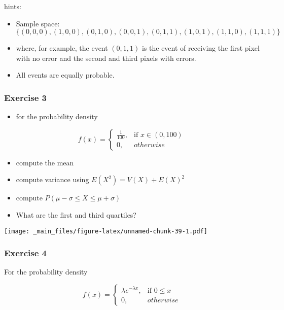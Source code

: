 \documentclass[
]{book}
\providecommand{\tightlist}{%
  \setlength{\itemsep}{0pt}\setlength{\parskip}{0pt}}
\begin{document}
hints:

\begin{itemize}
\item
  Sample space: \(\{(0,0,0), (1,0,0), (0,1,0), (0,0,1), (0,1,1), (1,0,1), (1,1,0), (1,1,1)\}\)
\item
  where, for example, the event \((0,1,1)\) is the event of receiving the first pixel with no error and the second and third pixels with errors.
\item
  All events are equally probable.
\end{itemize}

\hypertarget{exercise-3-1}{%
\subsubsection{Exercise 3}\label{exercise-3-1}}

\begin{itemize}
\tightlist
\item
  for the probability density
\end{itemize}

\[
    f(x)= 
\begin{cases}
    \frac{1}{100},& \text{if } x\in (0,100)\\
    0,& otherwise 
\end{cases}
\]

\begin{itemize}
\tightlist
\item
  compute the mean
\item
  compute variance using \(E(X^2)=V(X)+E(X)^2\)
\item
  compute \(P(\mu-\sigma\leq X \leq \mu+\sigma)\)
\item
  What are the first and third quartiles?
\end{itemize}

\texttt{[image: \_main\_files/figure-latex/unnamed-chunk-39-1.pdf]}

\hypertarget{exercise-4-1}{%
\subsubsection{Exercise 4}\label{exercise-4-1}}

For the probability density

\[
    f(x)= 
\begin{cases}
    \lambda e^{-\lambda x},& \text{if } 0 \leq x\\
    0,& otherwise 
\end{cases}
\]
\end{document}
